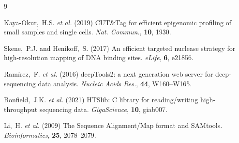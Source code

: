 \documentclass[11pt,a4paper]{article}
\begin{document}
\begin{thebibliography}{9}

Kaya-Okur,~H.S. \textit{et al.} (2019)
CUT\&Tag for efficient epigenomic profiling of small samples and single cells.
\textit{Nat. Commun.}, \textbf{10}, 1930.

Skene,~P.J. and Henikoff,~S. (2017)
An efficient targeted nuclease strategy for high-resolution mapping of DNA
binding sites. \textit{eLife}, \textbf{6}, e21856.

Ram{\'i}rez,~F. \textit{et al.} (2016)
deepTools2: a next generation web server for deep-sequencing data analysis.
\textit{Nucleic Acids Res.}, \textbf{44}, W160--W165.

Bonfield,~J.K. \textit{et al.} (2021)
HTSlib: C library for reading/writing high-throughput sequencing data.
\textit{GigaScience}, \textbf{10}, giab007.

Li,~H. \textit{et al.} (2009)
The Sequence Alignment/Map format and SAMtools.
\textit{Bioinformatics}, \textbf{25}, 2078--2079.

\end{thebibliography}
\end{document}
